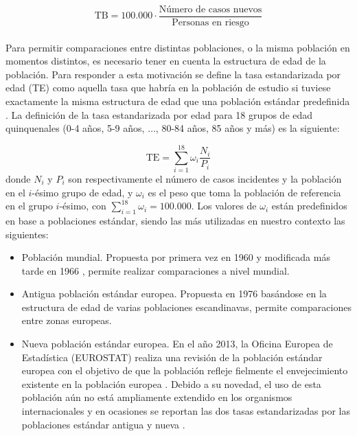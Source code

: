 $$\text{TB}  = 100.000 \cdot \dfrac{\text{Número de casos nuevos}}{\text{Personas en riesgo}}$$\\

Para permitir comparaciones entre distintas poblaciones, o la misma población en momentos distintos, es necesario tener en cuenta la estructura de edad de la población. Para responder a esta motivación se define la tasa estandarizada por edad (TE) como aquella tasa que habría en la población de estudio si tuviese exactamente la misma estructura de edad que una población estándar predefinida \cite{IARC1995}. La definición de la tasa estandarizada por edad para 18 grupos de edad quinquenales (0-4 años, 5-9 años, $\dots$, 80-84 años, 85 años y más) es la siguiente:

$$\text{TE} = \sum_{i = 1}^{18} \omega_i \dfrac{N_i}{P_i} $$
donde $N_i$ y $P_i$ son respectivamente el número de casos incidentes y la población en el $i$-ésimo grupo de edad, y $\omega_i$ es el peso que toma la población de referencia en el grupo $i$-ésimo, con $\sum_{i = 1}^{18}\omega_i = 100.000$. Los valores de ${\omega_i}$ están predefinidos en base a poblaciones estándar, siendo las más utilizadas en nuestro contexto las siguientes:

\begin{itemize}
	
	\item Población mundial. Propuesta por primera vez en 1960 \cite{SegiM.1960} y modificada más tarde en 1966 \cite{Doll1966}, permite realizar comparaciones a nivel mundial.
		
	\item Antigua población estándar europea. Propuesta en 1976 \cite{Waterhouse1976} basándose en la estructura de edad de varias poblaciones escandinavas, permite comparaciones entre zonas europeas.
	
	\item Nueva población estándar europea. En el año 2013, la Oficina Europea de Estadística (EUROSTAT) realiza una revisión de la población estándar europea con el objetivo de que la población refleje fielmente el envejecimiento existente en la población europea \cite{EUROSTAT2013}. Debido a su novedad, el uso de esta población aún no está ampliamente extendido en los organismos internacionales \cite{ECIS2} y en ocasiones se reportan las dos tasas estandarizadas por las poblaciones estándar antigua y nueva \cite{ECIS}.

\end{itemize}

